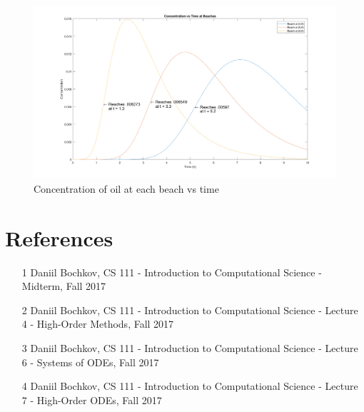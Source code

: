 \documentclass[12pt]{article}
\begin{document}
\begin{figure}[htb]
\begin{adjustwidth}{-2cm}{-2cm}
\centering
\hspace{-.9cm}\includegraphics[width=1.2\textwidth]{Problem2_fig4.png}
\caption*{Concentration of oil at each beach vs time}
\label{fig::p2_fig5}
\end{adjustwidth}
\end{figure}


\newpage
\clearpage
\setcounter{page}{1} \pagestyle{empty}
\section*{References}\label{sec::References}
\begin{itemize}
\item [1] Daniil Bochkov, CS 111 - Introduction to Computational Science - Midterm, Fall 2017
\item [2] Daniil Bochkov, CS 111 - Introduction to Computational Science - Lecture 4 - High-Order Methods, Fall 2017
\item [3] Daniil Bochkov, CS 111 - Introduction to Computational Science - Lecture 6 - Systems of ODEs,  Fall 2017
\item [4] Daniil Bochkov, CS 111 - Introduction to Computational Science - Lecture 7 - High-Order ODEs, Fall 2017
\end{itemize}
\end{document}
